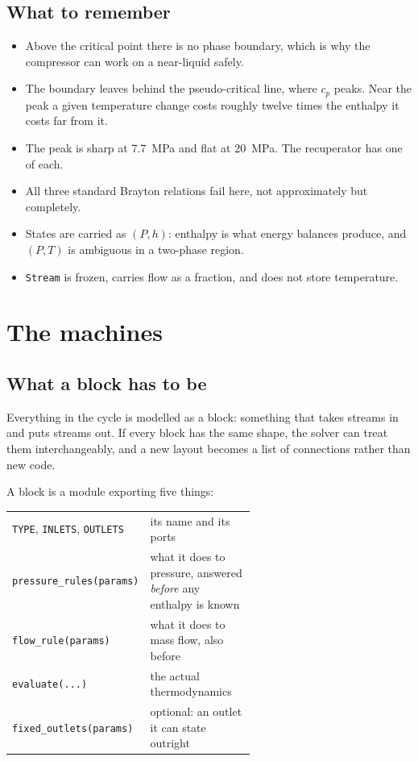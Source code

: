 \documentclass[11pt,a4paper]{report}
\newcommand{\code}[1]{\texttt{\small #1}}
\begin{document}
\section{What to remember}

\begin{itemize}\itemsep2pt
\item Above the critical point there is no phase boundary, which is why the
      compressor can work on a near-liquid safely.
\item The boundary leaves behind the pseudo-critical line, where $c_p$
      peaks. Near the peak a given temperature change costs roughly twelve
      times the enthalpy it costs far from it.
\item The peak is sharp at \SI{7.7}{\mega\pascal} and flat at
      \SI{20}{\mega\pascal}. The recuperator has one of each.
\item All three standard Brayton relations fail here, not approximately but
      completely.
\item States are carried as $(P,h)$: enthalpy is what energy balances
      produce, and $(P,T)$ is ambiguous in a two-phase region.
\item \code{Stream} is frozen, carries flow as a fraction, and does not
      store temperature.
\end{itemize}

\chapter{The machines}
\label{ch:machines}

\section{What a block has to be}

Everything in the cycle is modelled as a block: something that takes streams
in and puts streams out. If every block has the same shape, the solver can
treat them interchangeably, and a new layout becomes a list of connections
rather than new code.

A block is a module exporting five things:

\begin{center}
\begin{tabular}{@{}lp{0.60\linewidth}@{}}
\toprule
\code{TYPE}, \code{INLETS}, \code{OUTLETS} & its name and its ports \\
\code{pressure\_rules(params)} & what it does to pressure, answered
  \emph{before} any enthalpy is known \\
\code{flow\_rule(params)} & what it does to mass flow, also before \\
\code{evaluate(...)} & the actual thermodynamics \\
\code{fixed\_outlets(params)} & optional: an outlet it can state outright \\
\bottomrule
\end{tabular}
\end{center}
\end{document}
